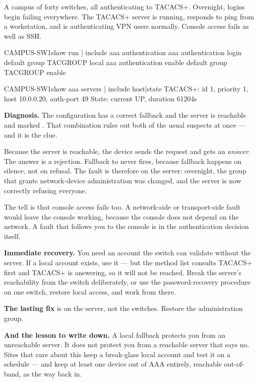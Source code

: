 \begin{breakfix}
A campus of forty switches, all authenticating to TACACS+. Overnight, logins
begin failing everywhere. The TACACS+ server is running, responds to ping from a
workstation, and is authenticating VPN users normally. Console access fails as
well as SSH.

\begin{verify}{CAMPUS-SW1}{show run | include aaa authentication}
aaa authentication login default group TACGROUP local
aaa authentication enable default group TACGROUP enable
\end{verify}

\begin{verify}{CAMPUS-SW1}{show aaa servers | include host|state}
TACACS+: id 1, priority 1, host 10.0.0.20, auth-port 49
     State: current UP, duration 61204s
\end{verify}

\textbf{Diagnosis.} The configuration has a correct fallback and the server is
reachable and marked . That combination rules out both of the usual
suspects at once --- and it is the clue.

Because the server is reachable, the device sends the request and gets an
\emph{answer}. The answer is a rejection. Fallback to  never fires,
because fallback happens on silence, not on refusal. The fault is therefore on
the server: overnight, the group that grants network-device administration was
changed, and the server is now correctly refusing everyone.

The tell is that console access fails too. A network-side or transport-side fault
would leave the console working, because the console does not depend on the
network. A fault that follows you to the console is in the authentication
decision itself.

\textbf{Immediate recovery.} You need an account the switch can validate without
the server. If a local account exists, use it --- but the method list consults
TACACS+ first and TACACS+ is answering, so it will not be reached. Break the
server's reachability from the switch deliberately, or use the password-recovery
procedure on one switch, restore local access, and work from there.

\textbf{The lasting fix} is on the server, not the switches. Restore the
administration group.

\textbf{And the lesson to write down.} A local fallback protects you from an
unreachable server. It does not protect you from a reachable server that says no.
Sites that care about this keep a break-glass local account and test it on a
schedule --- and keep at least one device out of AAA entirely, reachable
out-of-band, as the way back in.
\end{breakfix}

